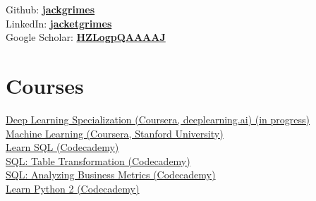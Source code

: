 \documentclass[]{cv-template}
\begin{document}
\begin{minipage}[t]{0.33\textwidth}
Github: \href{https://github.com/jackgrimes}{\bf jackgrimes} \\
LinkedIn: \href{https://www.linkedin.com/in/jacketgrimes}{\bf jacketgrimes} \\
Google Scholar: \href{https://scholar.google.co.uk/citations?hl=en&user=HZLogpQAAAAJ}{\bf HZLogpQAAAAJ} \\
\sectionsep


\section{Courses}
\href{https://www.coursera.org/specializations/deep-learning}{Deep Learning Specialization (Coursera, deeplearning.ai) (in progress)} \\
\href{https://www.coursera.org/learn/machine-learning}{Machine Learning (Coursera, Stanford University)} \\
\href{https://www.codecademy.com/learn/learn-sql}{Learn SQL (Codecademy)} \\
\href{https://www.codecademy.com/learn/sql-table-transformation}{SQL: Table Transformation (Codecademy)} \\
\href{https://www.codecademy.com/learn/sql-analyzing-business-metrics}{SQL: Analyzing Business Metrics (Codecademy)} \\
\href{https://www.codecademy.com/learn/learn-python}{Learn Python 2 (Codecademy)} \\
\sectionsep



\end{minipage}
\end{document}

